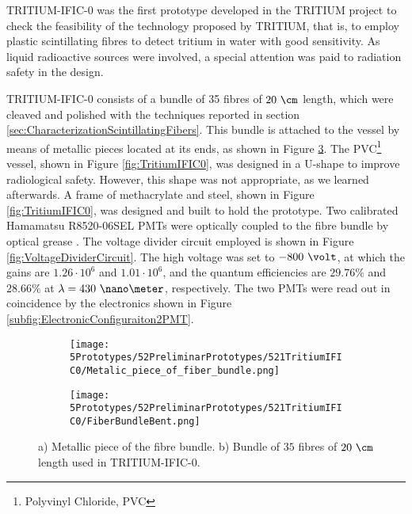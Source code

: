 TRITIUM-IFIC-0 was the first prototype developed in the TRITIUM project to check the feasibility of the technology proposed by TRITIUM, that is, to employ plastic scintillating fibres to detect tritium in water with good sensitivity. As liquid radioactive sources were involved, a special attention was paid to radiation safety in the design.

TRITIUM-IFIC-0 consists of a bundle of 35 fibres of $20~\cm$ length, which were cleaved and polished with the techniques reported in section \ref{sec:CharacterizationScintillatingFibers}. This bundle is attached to the vessel by means of metallic pieces located at its ends, as shown in Figure \ref{fig:FiberBundleOfTritiumIFIC0}. The PVC\footnote{Polyvinyl Chloride, PVC} vessel, shown in Figure \ref{fig:TritiumIFIC0}, was designed in a U-shape to improve radiological safety. However, this shape was not appropriate, as we learned afterwards. A frame of methacrylate and steel, shown in Figure \ref{fig:TritiumIFIC0}, was designed and built to hold the prototype. Two calibrated Hamamatsu R8520-06SEL PMTs \cite{DataSheetPMTs} were optically coupled to the fibre bundle by optical grease \cite{OpticalGrease}. The voltage divider circuit employed is shown in Figure  \ref{fig:VoltageDividerCircuit}. The high voltage was set to $-800~\volt$, at which the gains are $1.26 \cdot{} 10^6$ and $1.01 \cdot{} 10^6$, and the quantum efficiencies are $29.76\%$ and $28.66\%$ at $\lambda=430~\nano\meter$, respectively. The two PMTs were read out in coincidence by the electronics shown in Figure \ref{subfig:ElectronicConfiguraiton2PMT}.

\begin{figure}
\centering
    \begin{subfigure}[b]{0.5\textwidth}
    \centering
    \texttt{[image: 5Prototypes/52PreliminarPrototypes/521TritiumIFIC0/Metalic\_piece\_of\_fiber\_bundle.png]}  
    \caption{\label{subfig:MetalicPieceFiberBunchTritiumIFIC0}}
    \end{subfigure}
    \hfill
    \begin{subfigure}[b]{0.4\textwidth}
    \centering
    \texttt{[image: 5Prototypes/52PreliminarPrototypes/521TritiumIFIC0/FiberBundleBent.png]}  
    \caption{\label{subfig:FiberBunchTritiumIFIC0Bent}}
    \end{subfigure}
 \caption{a) Metallic piece of the fibre bundle. b) Bundle of $35$ fibres of $20~\cm$ length used in TRITIUM-IFIC-0.} \label{fig:FiberBundleOfTritiumIFIC0}
\end{figure}

